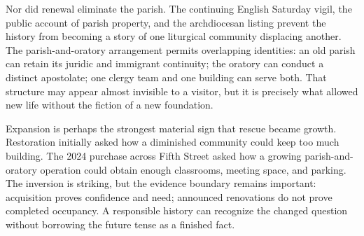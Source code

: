 Nor did renewal eliminate the parish. The continuing English Saturday vigil, the public account of parish property, and the archdiocesan listing prevent the history from becoming a story of one liturgical community displacing another. The parish-and-oratory arrangement permits overlapping identities: an old parish can retain its juridic and immigrant continuity; the oratory can conduct a distinct apostolate; one clergy team and one building can serve both. That structure may appear almost invisible to a visitor, but it is precisely what allowed new life without the fiction of a new foundation.

Expansion is perhaps the strongest material sign that rescue became growth. Restoration initially asked how a diminished community could keep too much building. The 2024 purchase across Fifth Street asked how a growing parish-and-oratory operation could obtain enough classrooms, meeting space, and parking. The inversion is striking, but the evidence boundary remains important: acquisition proves confidence and need; announced renovations do not prove completed occupancy. A responsible history can recognize the changed question without borrowing the future tense as a finished fact.

